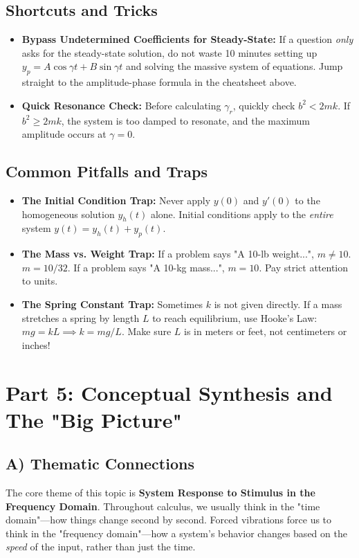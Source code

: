 \documentclass[11pt]{article}
\begin{document}
\subsection{Shortcuts and Tricks}
\begin{itemize}
    \item \textbf{Bypass Undetermined Coefficients for Steady-State:} If a question \textit{only} asks for the steady-state solution, do not waste 10 minutes setting up $y_p = A \cos \gamma t + B \sin \gamma t$ and solving the massive system of equations. Jump straight to the amplitude-phase formula in the cheatsheet above.
    \item \textbf{Quick Resonance Check:} Before calculating $\gamma_r$, quickly check $b^2 < 2mk$. If $b^2 \geq 2mk$, the system is too damped to resonate, and the maximum amplitude occurs at $\gamma = 0$.
\end{itemize}

\subsection{Common Pitfalls and Traps}
\begin{itemize}
    \item \textbf{The Initial Condition Trap:} Never apply $y(0)$ and $y'(0)$ to the homogeneous solution $y_h(t)$ alone. Initial conditions apply to the \textit{entire} system $y(t) = y_h(t) + y_p(t)$.
    \item \textbf{The Mass vs. Weight Trap:} If a problem says "A 10-lb weight...", $m \neq 10$. $m = 10/32$. If a problem says "A 10-kg mass...", $m = 10$. Pay strict attention to units.
    \item \textbf{The Spring Constant Trap:} Sometimes $k$ is not given directly. If a mass stretches a spring by length $L$ to reach equilibrium, use Hooke's Law: $mg = kL \implies k = mg/L$. Make sure $L$ is in meters or feet, not centimeters or inches!
\end{itemize}

\newpage
\section{Part 5: Conceptual Synthesis and The "Big Picture"}

\subsection{A) Thematic Connections}
The core theme of this topic is \textbf{System Response to Stimulus in the Frequency Domain}. Throughout calculus, we usually think in the "time domain"—how things change second by second. Forced vibrations force us to think in the "frequency domain"—how a system's behavior changes based on the \textit{speed} of the input, rather than just the time. 
\end{document}
